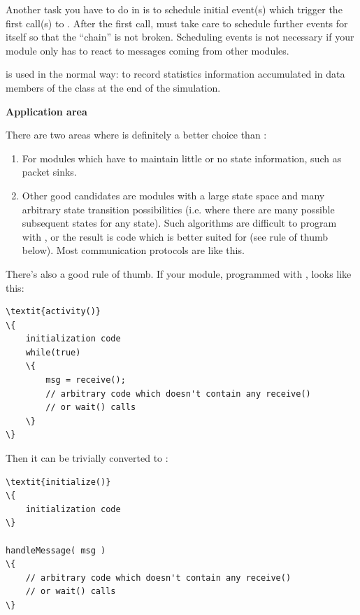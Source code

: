 Another task you have to do in  is to schedule
initial event(s) which trigger the first call(s)
to .  After the first call,
 must take care to schedule further events for
itself so that the ``chain'' is not broken. Scheduling events is not
necessary if your module only has to react to messages coming from
other modules.


 is used in the normal way: to record statistics information
accumulated in data members of the class at the end of the simulation.


\textbf{Application area}


There are two areas where  is definitely a better
choice than :
\begin{enumerate}
\item{For modules which have to maintain little or no state information,
    such as packet sinks.}
\item{Other good candidates are modules with a large state space and
    many arbitrary state transition possibilities (i.e. where there
    are many possible subsequent states for any state). Such algorithms
    are difficult to program with , or the result is code
    which is better suited for  (see rule of thumb
    below). Most communication protocols are like this.}
\end{enumerate}

There's also a good rule of thumb. If your module, programmed
with , looks like this:

\begin{Verbatim}[commandchars=\\\{\}]
\textit{activity()}
\{
    initialization code
    while(true)
    \{
        msg = receive();
        // arbitrary code which doesn't contain any receive()
        // or wait() calls
    \}
\}
\end{Verbatim}

Then it can be trivially converted to :

\begin{Verbatim}[commandchars=\\\{\}]
\textit{initialize()}
\{
    initialization code
\}

handleMessage( msg )
\{
    // arbitrary code which doesn't contain any receive()
    // or wait() calls
\}
\end{Verbatim}



